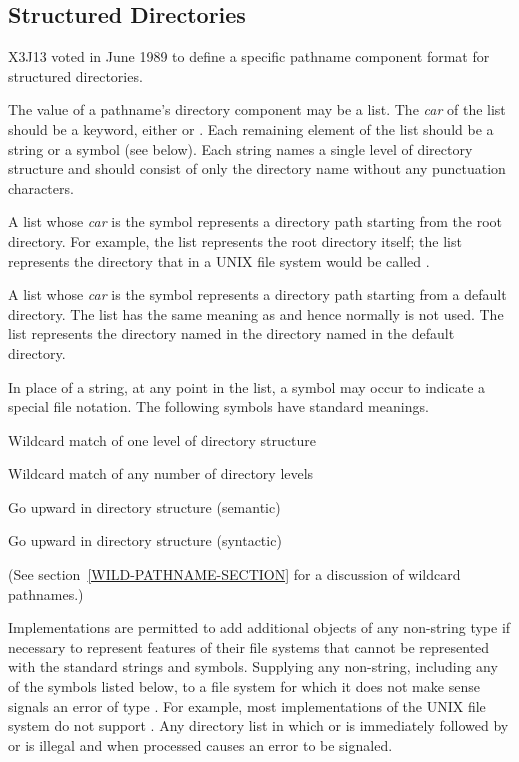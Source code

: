 \begin{newer}
\subsection{Structured Directories}
\label{STRUCTURED-DIRECTORY-SECTION}

X3J13 voted in June 1989 
to define a specific pathname component format for structured directories.

The value of a pathname's directory component may be a list.  The
  {\it car} of the list should be a keyword, either  or .
  Each remaining element of the list should be a string or a symbol (see below).
  Each string names a single level of directory structure and should consist
  of only the directory name without any punctuation characters.

  A list whose {\it car} is the symbol  represents a directory path
  starting from the root directory.  For example, the list  represents
  the root directory itself;  the list  represents
  the directory that in a UNIX file system would be called .

  A list whose {\it car} is the symbol  represents a directory path
  starting from a default directory.  The list  has the same
  meaning as  and hence normally is not used.  The list 
  represents the directory named  in the directory named  in the
  default directory.

  In place of a string, at any point in the list, a symbol may occur to
  indicate a special file notation. The following symbols have standard
  meanings.
\begin{indentdesc}{7pc}
\item[\cd{:wild}]            Wildcard match of one level of directory structure
\item[\cd{:wild-inferiors}]  Wildcard match of any number of directory levels
\item[\cd{:up}]              Go upward in directory structure (semantic)
\item[\cd{:back}]            Go upward in directory structure (syntactic)
\end{indentdesc}
  (See section~\ref{WILD-PATHNAME-SECTION} for a discussion of wildcard pathnames.)

  Implementations are permitted to add additional objects of any
  non-string type if necessary to represent features of their file systems
  that cannot be represented with the standard strings and symbols.
  Supplying any non-string, including any of the symbols listed below, to a
  file system for which it does not make sense signals an error of type
  .  For example, most implementations of the UNIX file system
  do not support .  Any directory list in which
   or  is immediately followed by  or 
  is illegal and when  processed causes an error to be signaled.


\end{newer}
